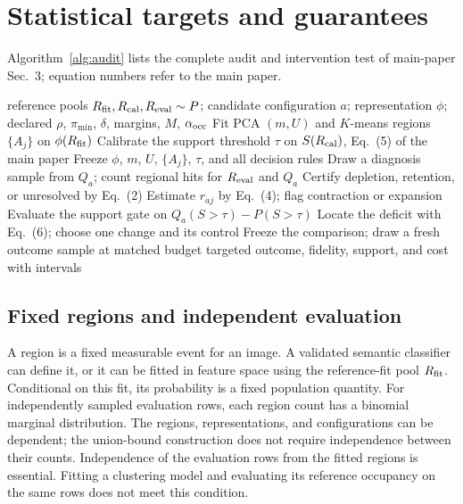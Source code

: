 \section{Statistical targets and guarantees}
\label{supp:statistics}
Algorithm~\ref{alg:audit} lists the complete audit and intervention test
of main-paper Sec.~3; equation numbers refer to the main paper.

\begin{algorithm}[t]
\caption{Fixed-reference audit and intervention test (main paper, Sec.~3)}
\label{alg:audit}
\small
\begin{algorithmic}[1]
\Require reference pools $R_{\rm fit},R_{\rm cal},R_{\rm eval}\sim P$; candidate
configuration $a$; representation $\phi$; declared $\rho$, $\pi_{\min}$, $\delta$,
margins, $M$, $\alpha_{\rm occ}$
\State Fit PCA $(m,U)$ and $K$-means regions $\{A_j\}$ on $\phi(R_{\rm fit})$
\State Calibrate the support threshold $\tau$ on $S(R_{\rm cal})$, Eq.~(5) of the main paper
\State Freeze $\phi$, $m$, $U$, $\{A_j\}$, $\tau$, and all decision rules
\State Draw a diagnosis sample from $Q_a$; count regional hits for $R_{\rm eval}$ and $Q_a$
\State Certify depletion, retention, or unresolved by Eq.~(2)
\State Estimate $r_{aj}$ by Eq.~(4); flag contraction or expansion
\EndFor
\State Evaluate the support gate on $Q_a(S>\tau)-P(S>\tau)$
\State Locate the deficit with Eq.~(6); choose one change and its control
\State Freeze the comparison; draw a fresh outcome sample at matched budget
\State \Return targeted outcome, fidelity, support, and cost with intervals
\end{algorithmic}
\end{algorithm}


\subsection{Fixed regions and independent evaluation}
A region is a fixed measurable event for an image. A validated semantic
classifier can define it, or it can be fitted in feature space using the
reference-fit pool $R_{\rm fit}$.
Conditional on this fit, its probability is a fixed population quantity.
For independently sampled evaluation rows, each region count has a binomial
marginal distribution. The regions, representations, and configurations can be
dependent; the union-bound construction does not require independence between
their counts. Independence of the evaluation rows from the fitted regions is
essential. Fitting a clustering model and evaluating its reference occupancy on
the same rows does not meet this condition.

